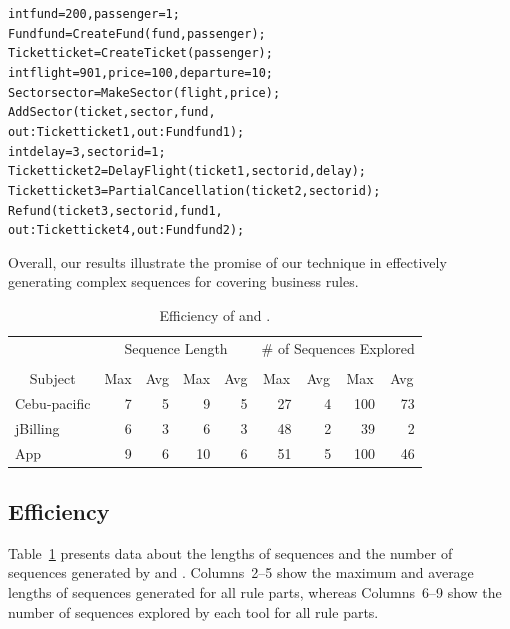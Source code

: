 {\scriptsize
\begin{alltt}
 int fund = 200, passenger = 1;
 Fund fund = CreateFund(fund, passenger);
 Ticket ticket = CreateTicket(passenger);
 int flight = 901, price = 100, departure = 10; 
 Sector sector = MakeSector(flight, price);
 AddSector(ticket, sector, fund,  
                out: Ticket ticket1, out: Fund fund1);
 int delay = 3, sectorid = 1; 
 Ticket ticket2 = DelayFlight(ticket1, sectorid, delay);
 Ticket ticket3 = PartialCancellation(ticket2, sectorid);
 Refund(ticket3, sectorid, fund1, 
                out: Ticket ticket4, out: Fund fund2);
\end{alltt}
}

Overall, our results illustrate the promise of our technique in effectively
generating complex sequences for covering business rules.

\begin{table}[t]
\caption{Efficiency of \tool{} and \exhaust{}.}
\centering
{\scriptsize
\tabcolsep=3pt
\begin{tabular}{|l|r|r|r|r|r|r|r|r|}
\hline
& \multicolumn{4}{|c|}{Sequence Length} & \multicolumn{4}{|c|}{\# of Sequences Explored} \\
\cline{2-9}
& \multicolumn{2}{|c|}{\tool{}} & \multicolumn{2}{|c|}{\exhaust{}} & \multicolumn{2}{|c|}{\tool{}} & \multicolumn{2}{|c|}{\exhaust{}}  \\
\cline{2-9}
\multicolumn{1}{|c|}{Subject} & \multicolumn{1}{|c|}{Max} & \multicolumn{1}{|c|}{Avg} & \multicolumn{1}{|c|}{Max} & \multicolumn{1}{|c|}{Avg} & \multicolumn{1}{|c|}{Max} & \multicolumn{1}{|c|}{Avg} & \multicolumn{1}{|c|}{Max} & \multicolumn{1}{|c|}{Avg} \\
\hline \hline
Cebu-pacific 	 &  7		& 5 &  9 &  5	 &  27 &  4	&  100 & 73 \\
jBilling		 	 &  6		& 3 &  6 &  3	 &  48 &  2	&  39  &  2 \\
App					 	 &  9		& 6 & 10 &  6	 &  51 &  5	& 100  & 46 \\
\hline
\end{tabular}
}
\label{tab:stats}
\end{table}

\subsection{Efficiency}

Table~\ref{tab:stats} presents data about the lengths of sequences and the
number of sequences generated by \tool{} and \exhaust{}. Columns~2--5 show the
maximum and average lengths of sequences generated for all rule parts, whereas
Columns~6--9 show the number of sequences explored by each tool for all rule
parts.

